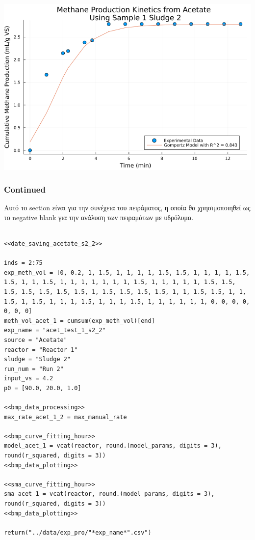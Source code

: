 \documentclass[11pt]{article}
\begin{document}
\begin{center}
\includegraphics[width=.9\linewidth]{../plots/BMPs/Acetate/specific_methane_kinetics_acet_test_1_s2.png}
\end{center}

\subsubsection{Continued}
\label{sec:org15bf180}
Αυτό το section είναι για την συνέχεια του πειράματος, η οποία θα χρησιμοποιηθεί ως το negative blank για την ανάλυση των πειραμάτων με υδρόλυμα.

\begin{verbatim}

<<date_saving_acetate_s2_2>>

inds = 2:75
exp_meth_vol = [0, 0.2, 1, 1.5, 1, 1, 1, 1, 1.5, 1.5, 1, 1, 1, 1, 1.5, 1.5, 1, 1, 1.5, 1, 1, 1, 1, 1, 1, 1, 1.5, 1, 1, 1, 1, 1, 1.5, 1.5, 1.5, 1.5, 1.5, 1.5, 1.5, 1, 1.5, 1.5, 1.5, 1.5, 1, 1, 1.5, 1.5, 1, 1, 1.5, 1, 1.5, 1, 1, 1, 1.5, 1, 1, 1, 1.5, 1, 1, 1, 1, 1, 1, 0, 0, 0, 0, 0, 0, 0]
meth_vol_acet_1 = cumsum(exp_meth_vol)[end]
exp_name = "acet_test_1_s2_2"
source = "Acetate"
reactor = "Reactor 1"
sludge = "Sludge 2"
run_num = "Run 2"
input_vs = 4.2
p0 = [90.0, 20.0, 1.0]

<<bmp_data_processing>>
max_rate_acet_1_2 = max_manual_rate

<<bmp_curve_fitting_hour>>
model_acet_1 = vcat(reactor, round.(model_params, digits = 3), round(r_squared, digits = 3))
<<bmp_data_plotting>>

<<sma_curve_fitting_hour>>
sma_acet_1 = vcat(reactor, round.(model_params, digits = 3), round(r_squared, digits = 3))  
<<bmp_data_plotting>>

return("../data/exp_pro/"*exp_name*".csv")

\end{verbatim}
\end{document}
